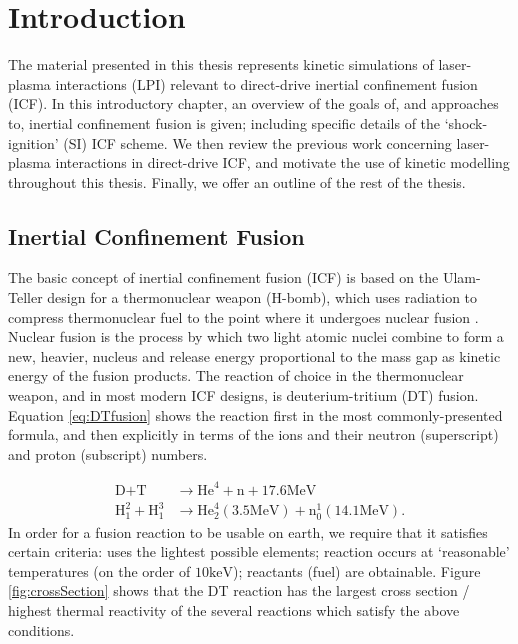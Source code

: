 \chapter{Introduction}
\label{chp:introduction}
The material presented in this thesis represents kinetic simulations of laser-plasma interactions (\acrshort{LPI}) relevant to direct-drive inertial confinement fusion (\acrshort{ICF}). In this introductory chapter, an overview of the goals of, and approaches to, inertial confinement fusion is given; including specific details of the `shock-ignition' (\acrshort{SI}) ICF scheme. We then review the previous work concerning laser-plasma interactions in direct-drive ICF, and motivate the use of kinetic modelling throughout this thesis. Finally, we offer an outline of the rest of the thesis.

\section{Inertial Confinement Fusion}
The basic concept of inertial confinement fusion (\acrshort{ICF}) is based on the Ulam-Teller design for a thermonuclear weapon (H-bomb), which uses radiation to compress thermonuclear fuel to the point where it undergoes nuclear fusion \citep{SpanishHistoryOfICF}.  Nuclear fusion is the process by which two light atomic nuclei combine to form a new, heavier, nucleus and release energy proportional to the mass gap as kinetic energy of the fusion products. The reaction of choice in the thermonuclear weapon, and in most modern ICF designs, is deuterium-tritium (\acrshort{DT}) fusion. Equation \ref{eq:DTfusion} shows the reaction first in the most commonly-presented formula, and then explicitly in terms of the ions and their neutron (superscript) and proton (subscript) numbers.

\begin{equation}\label{eq:DTfusion}
\begin{aligned}
	\text{D} + \text{T} &\longrightarrow \text{He}^4 + \text{n} + 17.6 \si{\mega\electronvolt}\\
	\text{H}^2_1 + \text{H}^3_1 &\longrightarrow \text{He}^4_2 (3.5\si{\mega\electronvolt}) + \text{n}^1_0 (14.1\si{\mega\electronvolt}).
\end{aligned}
\end{equation}
In order for a fusion reaction to be usable on earth, we require that it satisfies certain criteria: uses the lightest possible elements; reaction occurs at `reasonable' temperatures (on the order of $10 \si{\kilo\eV}$); reactants (fuel) are obtainable. Figure \ref{fig:crossSection} shows that the \acrshort{DT} reaction has the largest cross section / highest thermal reactivity of the several reactions which satisfy the above conditions.

